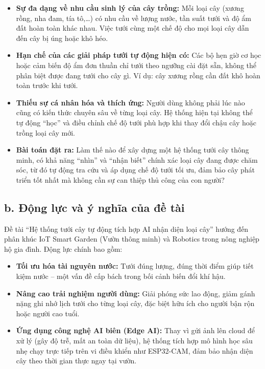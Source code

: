 \documentclass[12pt,a4paper]{report}
\begin{document}
\begin{itemize}
    \item \textbf{Sự đa dạng về nhu cầu sinh lý của cây trồng:} Mỗi loại cây
    (xương rồng, nha đam, tía tô,\ldots) có nhu cầu về lượng nước, tần suất tưới
    và độ ẩm đất hoàn toàn khác nhau. Việc tưới cùng một chế độ cho mọi loại cây
    dẫn đến cây bị úng hoặc khô héo.

    \item \textbf{Hạn chế của các giải pháp tưới tự động hiện có:} Các bộ hẹn giờ
    cơ học hoặc cảm biến độ ẩm đơn thuần chỉ tưới theo ngưỡng cài đặt sẵn, không
    thể phân biệt được đang tưới cho cây gì. Ví dụ: cây xương rồng cần đất khô
    hoàn toàn trước khi tưới.

    \item \textbf{Thiếu sự cá nhân hóa và thích ứng:} Người dùng không phải lúc
    nào cũng có kiến thức chuyên sâu về từng loại cây. Hệ thống hiện tại không thể
    tự động ``học'' và điều chỉnh chế độ tưới phù hợp khi thay đổi chậu cây hoặc
    trồng loại cây mới.

    \item \textbf{Bài toán đặt ra:} Làm thế nào để xây dựng một hệ thống tưới cây
    thông minh, có khả năng ``nhìn'' và ``nhận biết'' chính xác loại cây đang được
    chăm sóc, từ đó tự động tra cứu và áp dụng chế độ tưới tối ưu, đảm bảo cây
    phát triển tốt nhất mà không cần sự can thiệp thủ công của con người?
\end{itemize}

\subsection*{b. Động lực và ý nghĩa của đề tài}

Đề tài ``Hệ thống tưới cây tự động tích hợp AI nhận diện loại cây'' hướng
đến phân khúc IoT Smart Garden (Vườn thông minh) và Robotics trong nông nghiệp
hộ gia đình. Động lực chính bao gồm:

\begin{itemize}
    \item \textbf{Tối ưu hóa tài nguyên nước:} Tưới đúng lượng, đúng thời điểm
    giúp tiết kiệm nước -- một vấn đề cấp bách trong bối cảnh biến đổi khí hậu.

    \item \textbf{Nâng cao trải nghiệm người dùng:} Giải phóng sức lao động,
    giảm gánh nặng ghi nhớ lịch tưới cho từng loại cây, đặc biệt hữu ích cho
    người bận rộn hoặc người cao tuổi.

    \item \textbf{Ứng dụng công nghệ AI biên (Edge AI):} Thay vì gửi ảnh lên
    cloud để xử lý (gây độ trễ, mất an toàn dữ liệu), hệ thống tích hợp mô hình
    học sâu nhẹ chạy trực tiếp trên vi điều khiển như ESP32-CAM, đảm bảo nhận
    diện cây theo thời gian thực ngay tại vườn.
\end{itemize}
\end{document}
